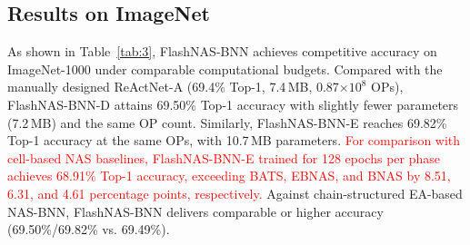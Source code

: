 \documentclass[a4paper,fleqn]{cas-sc}
\begin{document}
\subsection{Results on ImageNet}
As shown in Table~\ref{tab:3}, FlashNAS-BNN achieves competitive accuracy on ImageNet-1000 under comparable computational budgets. 
Compared with the manually designed ReActNet-A (69.4\% Top-1, 7.4\,MB, 0.87$\times10^8$ OPs), FlashNAS-BNN-D attains 69.50\% Top-1 accuracy with slightly fewer parameters (7.2\,MB) and the same OP count.
Similarly, FlashNAS-BNN-E reaches 69.82\% Top-1 accuracy at the same OPs, with 10.7\,MB parameters. \textcolor{red}{For comparison with cell-based NAS baselines, FlashNAS-BNN-E trained for 128 epochs per phase achieves 68.91\% Top-1 accuracy, exceeding BATS, EBNAS, and BNAS by 8.51, 6.31, and 4.61 percentage points, respectively.}
Against chain-structured EA-based NAS-BNN, FlashNAS-BNN delivers comparable or higher accuracy (69.50\%/69.82\% vs. 69.49\%).
\end{document}
